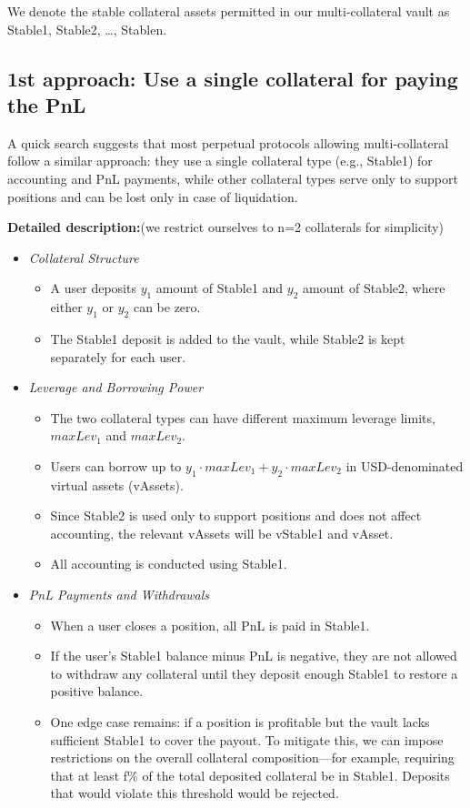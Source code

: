 \documentclass{article}
\begin{document}
We denote the stable collateral assets permitted in our multi-collateral vault as Stable1, Stable2, …, Stablen.

\subsection{1st approach: Use a single collateral for paying the PnL}

A quick search suggests that most perpetual protocols allowing multi-collateral follow a similar approach: they use a single collateral type (e.g., Stable1) for accounting and PnL payments, while other collateral types serve only to support positions and can be lost only in case of liquidation.

\textbf{Detailed description:}(we restrict ourselves to n=2 collaterals for simplicity)
\begin{itemize}
\item \textit{Collateral Structure}
	\begin{itemize}
	\item A user deposits $y_1$ amount of Stable1 and $y_2$ amount of Stable2, where either $y_1$ or $y_2$ can be zero.
	\item The Stable1 deposit is added to the vault, while Stable2 is kept separately for each user.
	\end{itemize}
\item \textit{Leverage and Borrowing Power}
	\begin{itemize}

	\item The two collateral types can have different maximum leverage limits, $maxLev_1$ and $maxLev_2$.
	\item Users can borrow up to $y_1 \cdot maxLev_1 + y_2 \cdot maxLev_2$ in USD-denominated virtual assets (vAssets).
	\item Since Stable2 is used only to support positions and does not affect accounting, the relevant vAssets will be vStable1 and vAsset.
	\item All accounting is conducted using Stable1.
	\end{itemize}
	
\item \textit{PnL Payments and Withdrawals}
	\begin{itemize}
	\item When a user closes a position, all PnL is paid in Stable1.
	\item If the user's Stable1 balance minus PnL is negative, they are not allowed to withdraw any collateral until they deposit enough Stable1 to restore a positive balance.
	\item One edge case remains: if a position is profitable but the vault lacks sufficient Stable1 to cover the payout. To mitigate this, we can impose restrictions on the overall collateral composition—for example, requiring that at least f\% of the total deposited collateral be in Stable1. Deposits that would violate this threshold would be rejected.
\end{itemize}
	

\end{itemize}
\end{document}
